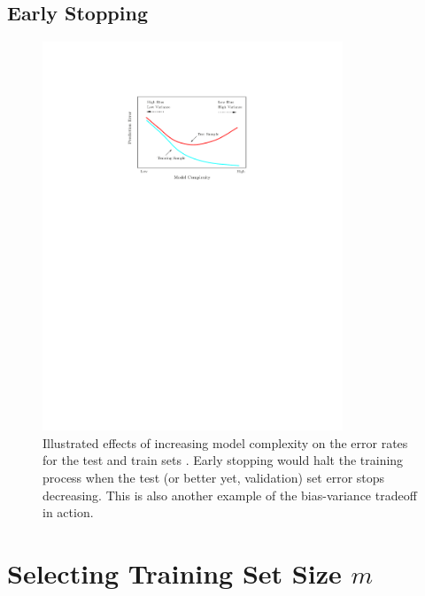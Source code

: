 \subsection{Early Stopping}
\label{ml_general:reg:early_stopping}

\begin{figure}[H]
  \centering
  \includegraphics[width=0.8\textwidth]{figures/ml/test_train_err_curves}
\caption{
Illustrated effects of increasing model complexity on the error rates for the test and train sets \cite{HastieTF09}.
Early stopping would halt the training process when the test (or better yet, validation) set error stops decreasing.
This is also another example of the bias-variance tradeoff in action.
}
\label{fig:ml_general:early_stopping}
\end{figure}

\section{Selecting Training Set Size \texorpdfstring{$m$}{m}}
\label{ml_general:enough_training_data}

